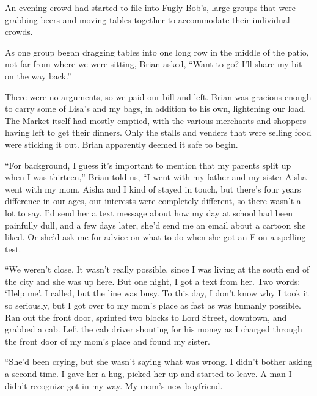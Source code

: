 





An evening crowd had started to file into Fugly Bob's, large groups that were grabbing beers and moving tables together to accommodate their individual crowds.



As one group began dragging tables into one long row in the middle of the patio, not far from where we were sitting, Brian asked, ``Want to go?  I'll share my bit on the way back.''



There were no arguments, so we paid our bill and left.  Brian was gracious enough to carry some of Lisa's and my bags, in addition to his own, lightening our load.  The Market itself had mostly emptied, with the various merchants and shoppers having left to get their dinners.  Only the stalls and venders that were selling food were sticking it out.  Brian apparently deemed it safe to begin.



``For background, I guess it's important to mention that my parents split up when I was thirteen,'' Brian told us, ``I went with my father and my sister Aisha went with my mom.  Aisha and I kind of stayed in touch, but there's four years difference in our ages, our interests were completely different, so there wasn't a lot to say.  I'd send her a text message about how my day at school had been painfully dull, and a few days later, she'd send me an email about a cartoon she liked.  Or she'd ask me for advice on what to do when she got an F on a spelling test.



``We weren't close.  It wasn't really possible, since I was living at the south end of the city and she was up here.  But one night, I got a text from her.  Two words: `Help me'.  I called, but the line was busy.  To this day, I don't know why I took it so seriously, but I got over to my mom's place as fast as was humanly possible.  Ran out the front door, sprinted two blocks to Lord Street, downtown, and grabbed a cab.  Left the cab driver shouting for his money as I charged through the front door of my mom's place and found my sister.



``She'd been crying, but she wasn't saying what was wrong.  I didn't bother asking a second time.  I gave her a hug, picked her up and started to leave.  A man I didn't recognize got in my way.  My mom's new boyfriend.



